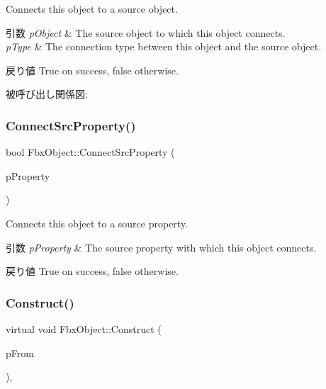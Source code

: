 Connects this object to a source object. 
\begin{DoxyParams}{引数}
{\em p\+Object} & The source object to which this object connects. \\
\hline
{\em p\+Type} & The connection type between this object and the source object. \\
\hline
\end{DoxyParams}
\begin{DoxyReturn}{戻り値}
{\ttfamily True} on success, {\ttfamily false} otherwise. 
\end{DoxyReturn}
被呼び出し関係図\+:
\mbox{\label{class_fbx_object_aef0b1c0672a044b6e44c824b9469c7e7}} 
\subsubsection{\texorpdfstring{Connect\+Src\+Property()}{ConnectSrcProperty()}}
{\footnotesize\ttfamily bool Fbx\+Object\+::\+Connect\+Src\+Property (\begin{DoxyParamCaption}\item[{const \hyperlink{class_fbx_property}{Fbx\+Property} \&}]{p\+Property }\end{DoxyParamCaption})}

Connects this object to a source property. 
\begin{DoxyParams}{引数}
{\em p\+Property} & The source property with which this object connects. \\
\hline
\end{DoxyParams}
\begin{DoxyReturn}{戻り値}
{\ttfamily True} on success, {\ttfamily false} otherwise. 
\end{DoxyReturn}
\mbox{\label{class_fbx_object_a313503bc645af3fdceb4a99ef5cea7eb}} 
\subsubsection{\texorpdfstring{Construct()}{Construct()}}
{\footnotesize\ttfamily virtual void Fbx\+Object\+::\+Construct (\begin{DoxyParamCaption}\item[{const \hyperlink{class_fbx_object}{Fbx\+Object} $\ast$}]{p\+From }\end{DoxyParamCaption})\hspace{0.3cm}{\ttfamily [protected]}, {\ttfamily [virtual]}}

